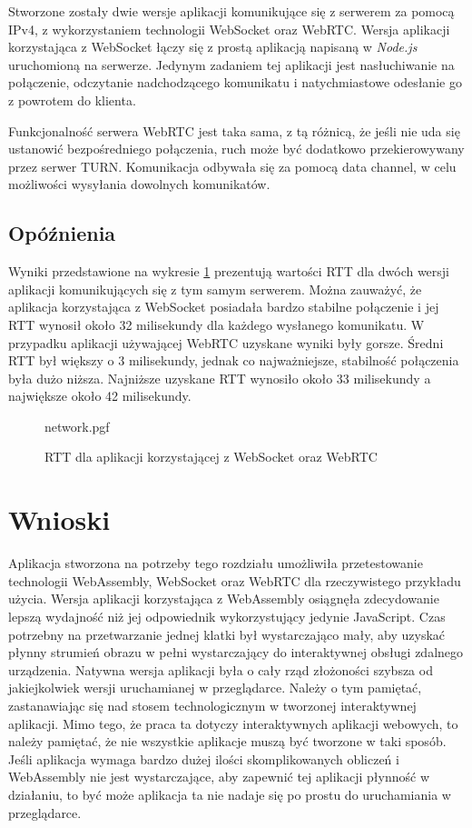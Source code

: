\documentclass[language=polish,type=master]{aghmodern}
\begin{document}
Stworzone zostały dwie wersje aplikacji komunikujące się z serwerem za pomocą IPv4, z wykorzystaniem technologii WebSocket oraz WebRTC.
Wersja aplikacji korzystająca z WebSocket łączy się z prostą aplikacją napisaną w \emph{Node.js}\footnotemark{} uruchomioną na serwerze.
Jedynym zadaniem tej aplikacji jest nasłuchiwanie na połączenie, odczytanie nadchodzącego komunikatu i natychmiastowe odesłanie go z powrotem do klienta.

Funkcjonalność serwera WebRTC jest taka sama, z tą różnicą, że jeśli nie uda się ustanowić bezpośredniego połączenia, ruch może być dodatkowo przekierowywany przez serwer TURN.
Komunikacja odbywała się za pomocą data channel, w celu możliwości wysyłania dowolnych komunikatów.

\subsection{Opóźnienia}
Wyniki przedstawione na wykresie \ref{fig:network} prezentują wartości RTT dla dwóch wersji aplikacji komunikujących się z tym samym serwerem.
Można zauważyć, że aplikacja korzystająca z WebSocket posiadała bardzo stabilne połączenie i jej RTT wynosił około 32 milisekundy dla każdego wysłanego komunikatu.
W przypadku aplikacji używającej WebRTC uzyskane wyniki były gorsze.
Średni RTT był większy o 3 milisekundy, jednak co najważniejsze, stabilność połączenia była dużo niższa.
Najniższe uzyskane RTT wynosiło około 33 milisekundy a największe około 42 milisekundy.

\begin{figure}[H]
    \centering
    {network.pgf}
    \vspace*{5pt}
    \caption{RTT dla aplikacji korzystającej z WebSocket oraz WebRTC}
    \label{fig:network}
\end{figure}

\section{Wnioski}
Aplikacja stworzona na potrzeby tego rozdziału umożliwiła przetestowanie technologii WebAssembly, WebSocket oraz WebRTC dla rzeczywistego przykładu użycia.
Wersja aplikacji korzystająca z WebAssembly osiągnęła zdecydowanie lepszą wydajność niż jej odpowiednik wykorzystujący jedynie JavaScript.
Czas potrzebny na przetwarzanie jednej klatki był wystarczająco mały, aby uzyskać płynny strumień obrazu w pełni wystarczający do interaktywnej obsługi zdalnego urządzenia.
Natywna wersja aplikacji była o cały rząd złożoności szybsza od jakiejkolwiek wersji uruchamianej w przeglądarce.
Należy o tym pamiętać, zastanawiając się nad stosem technologicznym w tworzonej interaktywnej aplikacji.
Mimo tego, że praca ta dotyczy interaktywnych aplikacji webowych, to należy pamiętać, że nie wszystkie aplikacje muszą być tworzone w taki sposób.
Jeśli aplikacja wymaga bardzo dużej ilości skomplikowanych obliczeń i WebAssembly nie jest wystarczające, aby zapewnić tej aplikacji płynność w działaniu, to być może aplikacja ta nie nadaje się po prostu do uruchamiania w przeglądarce.
\end{document}
